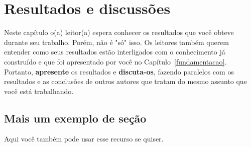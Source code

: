 \chapter{Resultados e discussões}
\label{resultados}

Neste capítulo o(a) leitor(a) espera conhecer os resultados que você obteve durante seu trabalho. Porém, não é "só" isso. Os leitores também querem entender como seus resultados estão interligados com o conhecimento já construído e que foi apresentado por você no Capítulo~\ref{fundamentacao}. Portanto, \textbf{apresente} os resultados e \textbf{discuta-os}, fazendo paralelos com os resultados e as conclusões de outros autores que tratam do mesmo assunto que você está trabalhando.

\section{Mais um exemplo de seção}

Aqui você também pode usar esse recurso se quiser.


